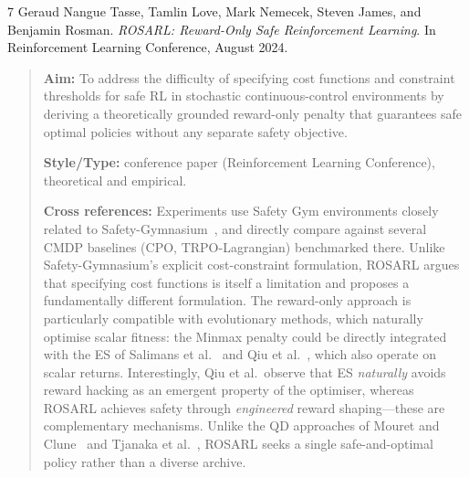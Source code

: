 \documentclass[12pt, a4paper]{article}
\begin{document}
\begin{thebibliography}{7}
Geraud Nangue Tasse, Tamlin Love, Mark Nemecek, Steven James, and Benjamin Rosman.
\textit{ROSARL: Reward-Only Safe Reinforcement Learning}.
In Reinforcement Learning Conference, August 2024.

\begin{quotation}
\noindent
\textbf{Aim:} To address the difficulty of specifying cost functions and constraint thresholds for safe RL in stochastic continuous-control environments by deriving a theoretically grounded reward-only penalty that guarantees safe optimal policies without any separate safety objective.

\textbf{Style/Type:} conference paper (Reinforcement Learning Conference), theoretical and empirical.

\textbf{Cross references:} Experiments use Safety Gym environments closely related to Safety-Gymnasium~\cite{ji2023safety}, and directly compare against several CMDP baselines (CPO, TRPO-Lagrangian) benchmarked there. Unlike Safety-Gymnasium's explicit cost-constraint formulation, ROSARL argues that specifying cost functions is itself a limitation and proposes a fundamentally different formulation. The reward-only approach is particularly compatible with evolutionary methods, which naturally optimise scalar fitness: the Minmax penalty could be directly integrated with the ES of Salimans et al.~\cite{salimans2017evolution} and Qiu et al.~\cite{qiu2026evolution}, which also operate on scalar returns. Interestingly, Qiu et al.\ observe that ES \emph{naturally} avoids reward hacking as an emergent property of the optimiser, whereas ROSARL achieves safety through \emph{engineered} reward shaping---these are complementary mechanisms. Unlike the QD approaches of Mouret and Clune~\cite{mouret2015illuminating} and Tjanaka et al.~\cite{tjanaka2022approximating}, ROSARL seeks a single safe-and-optimal policy rather than a diverse archive.


\end{quotation}
\end{thebibliography}
\end{document}
